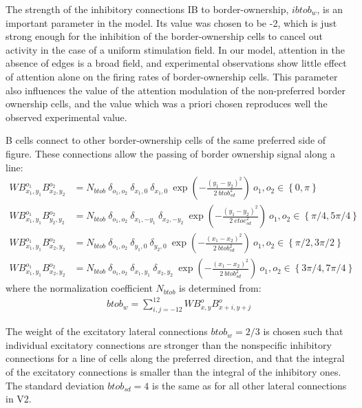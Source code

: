 The strength of the inhibitory connections IB to border-ownership, $ibtob_w$, is an important parameter in the
model. Its value was chosen to be -2, which is just strong enough for
the inhibition of the border-ownership cells to 
cancel out activity
in the case of a uniform stimulation field. In our model, attention in the absence of edges is a broad field, and experimental observations show little effect of attention alone on the firing rates of border-ownership cells. This parameter also influences the value of the attention modulation of the non-preferred border ownership cells, and the value which was a
priori chosen reproduces well the observed experimental value.

B cells connect to other border-ownership cells of the same preferred
side of figure. These connections allow the passing of border
ownership signal along a line: 
\begin{align}
	WB^{o_1}_{x_1,y_1}B^{o_2}_{x_2,y_2}&=N_{btob}\: \delta_{o_1,o_2}\: \delta_{x_1,0}\: \delta_{x_1,0}\: 
	\exp\left(-\frac{(y_1-y_2)^2}{2\: btob_{sd} ^2}\right)\  o_1,o_2\in \left\{0,\pi\right\}\nonumber\\
	WB^{o_1}_{x_1,y_1}B^{o_2}_{y_2,y_2}&=N_{btob}\: \delta_{o_1,o_2}\: \delta_{x_1,-y_1}\: \delta_{x_2,-y_2}\:
	\exp\left(-\frac{(y_1-y_2)^2}{2\: etoe_{sd} ^2}\right)\  o_1,o_2\in \left\{\pi/4,5\pi/4 \right\}\nonumber\\
	WB^{o_1}_{x_1,y_1}B^{o_2}_{x_2,y_2}&=N_{btob}\: \delta_{o_1,o_2}\: \delta_{y_1,0}\: \delta_{y_2,0}\: 
	\exp\left(-\frac{(x_1-x_2)^2}{2\: btob_{sd} ^2}\right)\ o_1,o_2\in \left\{\pi/2,3\pi/2 \right\}\nonumber\\
	WB^{o_1}_{x_1,y_1}B^{o_2}_{x_2,y_2}&=N_{btob}\: \delta_{o_1,o_2}\: \delta_{x_1,y_1}\: \delta_{x_2,y_2}\: 
	\exp\left(-\frac{(x_1-x_2)^2}{2\: btob_{sd} ^2}\right)\  o_1,o_2\in \left\{3\pi/4,7\pi/4 \right\}	
\end{align}
where the normalization coefficient $N_{btob}$ is determined from:
\begin{align}
	btob_w = \sum^{12}_{i,j=-12} WB^{o}_{x,y}B^{o}_{x+i,y+j}
\end{align}

The weight of the excitatory lateral connections $btob_w=2/3$ is
chosen such that individual excitatory connections are stronger than
the nonspecific inhibitory connections for a line of cells along the
preferred direction, 
and that the integral of the excitatory connections is smaller than
the integral of the inhibitory ones. The standard deviation
$btob_{sd}=4$ is the same as for all other lateral connections in V2.  

